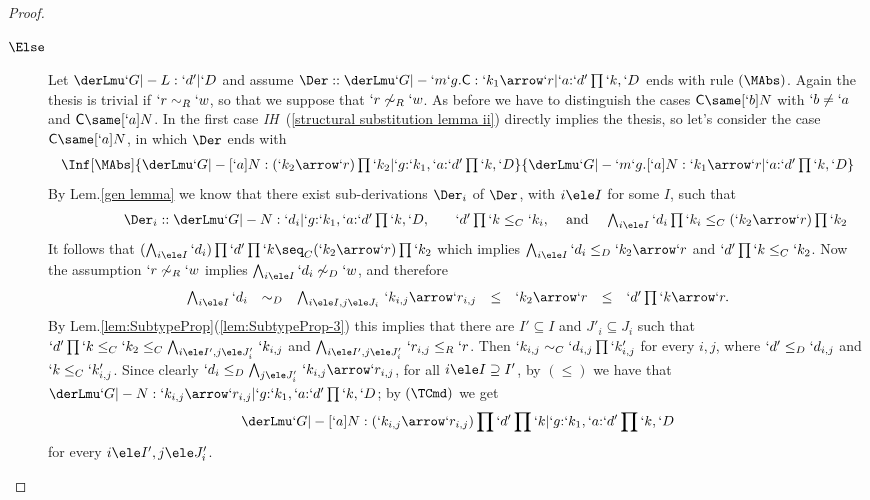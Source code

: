 \documentclass{CSML}
\begin{document}
\begin{proof}
\begin{enumerate}
\begin{description}
 \item [$\Else$]
Let $\derLmu `G |- L : `d' | `D $ and assume $\Der::\derLmu `G |- `m`g.\Cmd : `k_1\arrow `r | `a{:}`d'\prod`k,`D $ ends with rule $(\MAbs)$. Again the thesis
is trivial if $`r \sim_R `w$, so that we suppose that $`r \not\sim_R `w$. As before we have to distinguish the cases
$\Cmd \same [`b]N$ with $`b \neq `a$ and $\Cmd \same [`a]N$. In the first case \emph{IH}~(\ref{structural substitution lemma ii}) directly implies the thesis, so let's consider the case $\Cmd \same [`a]N$, in which $\Der$ ends with
 \[ \begin{array}{c}
\Inf[\MAbs]
	{\derLmu `G |- {[`a]N}: (`k_2\arrow `r)\prod `k_2 | `g{:}`k_1, `a{:}`d'\prod `k,`D }
	{\derLmu `G |- {`m `g.[`a]N} : `k_1\arrow `r | `a{:}`d'\prod `k,`D }
 \end{array}\]
By Lem.\skp\ref{gen lemma} we know that there exist sub-derivations $\Der_i$ of $\Der$, with $i\ele I$ for some $I$, such that
 \[ \qquad\qquad\begin{array}{ccccc}
\Der_i:: \derLmu `G |- {N}: `d_i | `g{:}`k_1, `a{:}`d'\prod `k,`D, & &
`d'\prod `k \leq_C `k_i, & \textrm{ and } & \bigwedge_{i\ele I} `d_i\prod `k_i \leq_C (`k_2\arrow `r)\prod `k_2
 \end{array}\]
It follows that
$(\bigwedge_{i\ele I} `d_i)\prod `d'\prod `k \seq_C (`k_2\arrow `r)\prod `k_2$ which implies
$\bigwedge_{i\ele I} `d_i \leq_D `k_2\arrow `r$ and $`d'\prod `k \leq_C `k_2$.
Now the assumption $`r \not\sim_R `w$ implies $\bigwedge_{i\ele I} `d_i \not\sim_D `w$, and therefore
 \[ \begin{array}{rcl@{\quad}lccc}
\bigwedge_{i\ele I} `d_i &\sim_D& \bigwedge_{i\ele I, j\ele J_i}\, `k_{i,j}\arrow `r_{i,j} &\leq& `k_2\arrow `r &\leq& `d'\prod `k\arrow`r.
 \end{array} \]
By Lem.\skp\ref{lem:SubtypeProp}\skp(\ref{lem:SubtypeProp-3}) this implies that there are $I' \subseteq I$ and $J'_i \subseteq J_i$ such that
$`d'\prod `k \leq_C `k_2 \leq_C \bigwedge_{i\ele I', j\ele J'_i}\, `k_{i,j}$ and $\bigwedge_{i\ele I', j\ele J'_i}\, `r_{i,j} \leq_R `r$.
Then $`k_{i,j} \sim_C `d_{i,j}\prod `k'_{i,j}$ for every $i,j$, where $`d' \leq_D `d_{i,j}$ and 
$`k \leq_C `k'_{i,j}$. Since clearly $`d_i \leq_D \bigwedge_{j\ele J'_i}\, `k_{i,j}\arrow `r_{i,j}$, for all $i\ele I \supseteq I'$,
by $(\leq)$ we have that
$\derLmu `G |- N : `k_{i,j}\arrow `r_{i,j} | `g{:}`k_1, `a{:}`d'\prod `k,`D $; by $(\TCmd)$ we get
 \[ \derLmu `G |- {[`a]N}: (`k_{i,j}\arrow `r_{i,j})\prod `d'\prod `k | `g{:}`k_1, `a{:}`d'\prod `k,`D \]
for every $i\ele I', j\ele J'_i$. 

\end{description}
\end{enumerate}
\end{proof}
\end{document}
